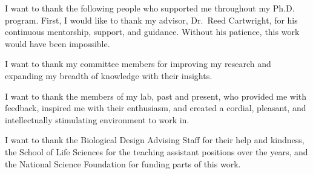 \begin{acknowledgments}

I want to thank the following people who supported me throughout my Ph.D. program. First, I would like to thank my advisor, Dr.~Reed Cartwright, for his continuous mentorship, support, and guidance. Without his patience, this work would have been impossible.

I want to thank my committee members for improving my research and expanding my breadth of knowledge with their insights.

I want to thank the members of my lab, past and present, who provided me with feedback, inspired me with their enthusiasm, and created a cordial, pleasant, and intellectually stimulating environment to work in.
 
I want to thank the Biological Design Advising Staff for their help and kindness, the School of Life Sciences for the teaching assistant positions over the years, and the National Science Foundation for funding parts of this work.
\end{acknowledgments}
